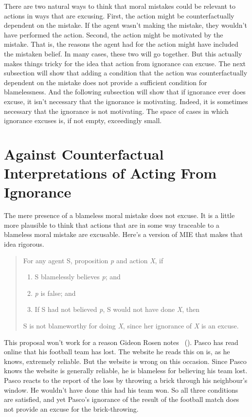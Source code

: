 \documentclass[
  10pt,
  letterpaper,
  twoside]{scrbook}
\providecommand{\tightlist}{%
  \setlength{\itemsep}{0pt}\setlength{\parskip}{0pt}}\usepackage{longtable,booktabs,array}
\begin{document}
There are two natural ways to think that moral mistakes could be
relevant to actions in ways that are excusing. First, the action might
be counterfactually dependent on the mistake. If the agent wasn't making
the mistake, they wouldn't have performed the action. Second, the action
might be motivated by the mistake. That is, the reasons the agent had
for the action might have included the mistaken belief. In many cases,
these two will go together. But this actually makes things tricky for
the idea that action from ignorance can excuse. The next subsection will
show that adding a condition that the action was counterfactually
dependent on the mistake does not provide a sufficient condition for
blamelessness. And the following subsection will show that if ignorance
ever does excuse, it isn't necessary that the ignorance is motivating.
Indeed, it is sometimes necessary that the ignorance is not motivating.
The space of cases in which ignorance excuses is, if not empty,
exceedingly small.

\section{Against Counterfactual Interpretations of Acting From
Ignorance}\label{againstcounterfactualinterpretationsofactingfromignorance}

The mere presence of a blameless moral mistake does not excuse. It is a
little more plausible to think that actions that are in some way
traceable to a blameless moral mistake are excusable. Here's a version
of MIE that makes that idea rigorous.

\begin{quote}
For any agent S, proposition \emph{p} and action \emph{X}, if

\begin{enumerate}
\def\labelenumi{\arabic{enumi}.}
\tightlist
\item
  S blamelessly believes \emph{p}; and
\item
  \emph{p} is false; and
\item
  If S had not believed \emph{p}, S would not have done \emph{X}, then
\end{enumerate}

S is not blameworthy for doing \emph{X}, since her ignorance of \emph{X}
is an excuse.
\end{quote}

This proposal won't work for a reason Gideon Rosen notes
~(). {Pasco} has read online
that his football team has lost. The website he reads this on is, as he
knows, extremely reliable. But the website is wrong on this occasion.
Since {Pasco} knows the website is generally reliable, he is blameless
for believing his team lost. {Pasco} reacts to the report of the loss by
throwing a brick through his neighbour's window. He wouldn't have done
this had his team won. So all three conditions are satisfied, and yet
{Pasco}'s ignorance of the result of the football match does not provide
an excuse for the brick-throwing.
\end{document}
